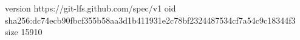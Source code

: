 version https://git-lfs.github.com/spec/v1
oid sha256:dc74ecb90fbcf355b58aa3d1b411931e2c78bf2324487534cf7a54c9c18344f3
size 15910
